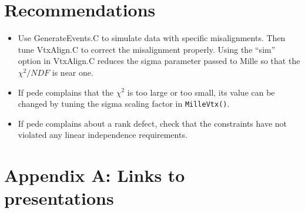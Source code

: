 \documentclass[12pt]{article}
\begin{document}
\section{Recommendations}
\begin{itemize}
  \item Use GenerateEvents.C to simulate data with specific misalignments. Then tune VtxAlign.C to correct the misalignment properly. Using the ``sim'' option in VtxAlign.C reduces the sigma parameter passed to Mille so that the $\chi^2/NDF$ is near one.
  \item If pede complains that the $\chi^2$ is too large or too small, its value can be changed by tuning the sigma scaling factor in \texttt{MilleVtx()}.
  \item If pede complains about a rank defect, check that the constraints have not violated any linear independence requirements. 
\end{itemize}
\section{Appendix A: Links to presentations}
\end{document}
